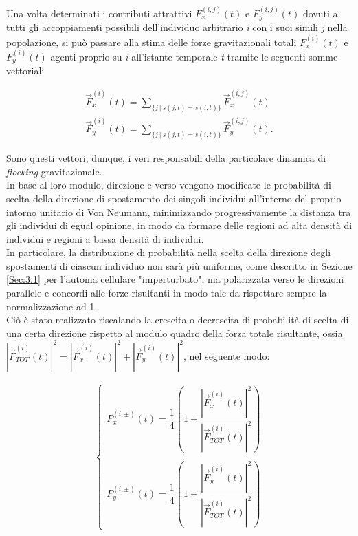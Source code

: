 \documentclass{article}
\begin{document}
Una volta determinati i contributi attrattivi $F_x^{(i,j)}(t)$ e $F_y^{(i,j)}(t)$ dovuti a tutti gli accoppiamenti possibili dell'individuo arbitrario \textit{i} con i suoi simili \textit{j} nella popolazione, si può passare alla stima delle forze gravitazionali totali $F_x^{(i)}(t)$ e $F_y^{(i)}(t)$ agenti proprio su \textit{i} all'istante temporale \textit{t} tramite le seguenti somme vettoriali

\begin{equation}
\begin{aligned}
    \vec{F}_x^{(i)}(t) = \sum_{ \{ j \ | \ s(j,t)=s(i,t) \} } \vec{F}_x^{(i,j)}(t) \\
    \vec{F}_y^{(i)}(t) = \sum_{ \{ j \ | \ s(j,t)=s(i,t) \} } \vec{F}_y^{(i,j)}(t).
\end{aligned}
\end{equation}

Sono questi vettori, dunque, i veri responsabili della particolare dinamica di \textit{flocking} gravitazionale.
\\ In base al loro modulo, direzione e verso vengono modificate le probabilità di scelta della direzione di spostamento dei singoli individui all'interno del proprio intorno unitario di Von Neumann, minimizzando progressivamente la distanza tra gli individui di egual opinione, in modo da formare delle regioni ad alta densità di individui e regioni a bassa densità di individui. 
\\ In particolare, la distribuzione di probabilità nella scelta della direzione degli spostamenti di ciascun individuo non sarà più uniforme, come descritto in Sezione \ref{Sec:3.1} per l'automa cellulare "imperturbato", ma polarizzata verso le direzioni parallele e concordi alle forze risultanti in modo tale da rispettare sempre la normalizzazione ad 1.
\\ Ciò è stato realizzato riscalando la crescita o decrescita di probabilità di scelta di una certa direzione rispetto al modulo quadro della forza totale risultante, ossia $|\vec{F}_{TOT}^{(i)}(t)|^2 =|\vec{F}_x^{(i)}(t)|^2+|\vec{F}_y^{(i)}(t)|^2$, nel seguente modo:

\begin{equation}
\begin{aligned}
\begin{cases}
P_x^{(i, \pm)}(t) = \dfrac{1}{4} \left ( 1 \pm \dfrac{|\vec{F}_x^{(i)}(t)|^2}{|\vec{F}_{TOT}^{(i)}(t)|^2} \right ) \\ \\
P_y^{(i, \pm)}(t) = \dfrac{1}{4} \left ( 1 \pm \dfrac{|\vec{F}_y^{(i)}(t)|^2}{|\vec{F}_{TOT}^{(i)}(t)|^2} \right )
\end{cases}
\end{aligned}
\end{equation}
\end{document}
